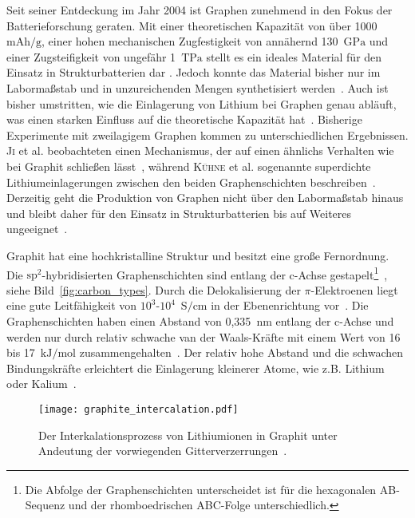 Seit seiner Entdeckung im Jahr 2004 \cite{Novoselov2004} ist Graphen zunehmend in den Fokus der Batterieforschung geraten. Mit einer theoretischen Kapazität von über 1000~$\si{\mA \hour \per \g}$, einer hohen mechanischen Zugfestigkeit von annähernd 130~$\si{\GPa}$ und einer Zugsteifigkeit von ungefähr 1~$\si{\tera \Pa}$ stellt es ein ideales Material für den Einsatz in Strukturbatterien dar \cite{Novoselov2012}. Jedoch konnte das Material bisher nur im Labormaßstab und in unzureichenden Mengen synthetisiert werden~\cite{Shams2015}. Auch ist bisher umstritten, wie die Einlagerung von Lithium bei Graphen genau abläuft, was einen starken Einfluss auf die theoretische Kapazität hat~\cite{Safie2023, Singh2024}. Bisherige Experimente mit zweilagigem Graphen kommen zu unterschiedlichen Ergebnissen. \textsc{Ji} et al. beobachteten einen Mechanismus, der auf einen ähnlichs Verhalten wie bei Graphit schließen lässt~\cite{Ji2019}, während \textsc{Kühne} et al. sogenannte superdichte Lithiumeinlagerungen zwischen den beiden Graphenschichten beschreiben~\cite{Kuehne2017}. Derzeitig geht die Produktion von Graphen nicht über den Labormaßstab hinaus und bleibt daher für den Einsatz in Strukturbatterien bis auf Weiteres ungeeignet~\cite{Zhu2014, Singh2024}.


Graphit hat eine hochkristalline Struktur und besitzt eine große Fernordnung. Die $\text{sp}^\text{2}$-hybridisierten Graphenschichten sind entlang der c-Achse gestapelt\footnote{Die Abfolge der Graphenschichten unterscheidet ist für die hexagonalen AB-Sequenz und der rhomboedrischen ABC-Folge unterschiedlich.}~\cite{Inagaki2014}, siehe Bild~\ref{fig:carbon_types}. Durch die Delokalisierung der $\pi$-Elektroenen liegt  eine gute Leitfähigkeit von $10^3$-$10^4$~$\si{\siemens \per \cm}$ in der Ebenenrichtung vor~\cite{Dutta1953}. Die Graphenschichten haben einen Abstand von 0,335~$\si{\nano\meter}$ entlang der c-Achse und werden nur durch relativ schwache van der Waals-Kräfte mit einem Wert von 16 bis 17~$\si{\kJ \per \mol}$ zusammengehalten~\cite{Xu2012}. Der relativ hohe Abstand und die schwachen Bindungskräfte erleichtert die Einlagerung kleinerer Atome, wie z.B. Lithium oder Kalium~\cite{Wang2021}.

\begin{figure}[!h]
        \center
		\texttt{[image: graphite\_intercalation.pdf]}
		\caption{\label{fig:graphite_intercalation}Der Interkalationsprozess von Lithiumionen in Graphit unter Andeutung der vorwiegenden Gitterverzerrungen~\cite{Nishidate2005,Markevich2005}.}
\end{figure}

